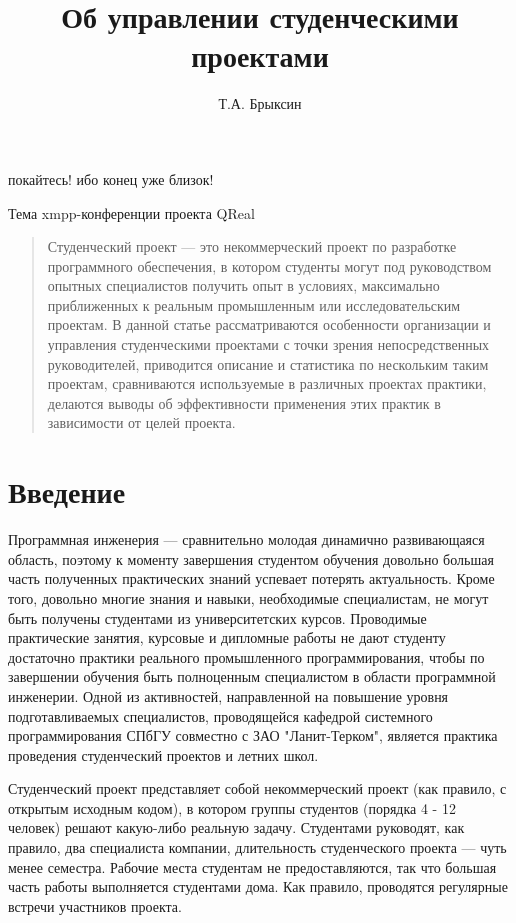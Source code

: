 \documentclass[a5paper]{article}
\title{Об управлении студенческими проектами}
\author{Т.А. Брыксин}
\date{}
\begin{document}
\maketitle
\thispagestyle{empty}

\epigraph{покайтесь! ибо конец уже близок!}%
         {Тема xmpp-конференции проекта QReal}

\begin{quote}
\small\noindent
Студенческий проект --- это некоммерческий проект по разработке программного обеспечения, в котором студенты могут под руководством опытных специалистов получить опыт в условиях, максимально приближенных к реальным промышленным или исследовательским проектам. В данной статье рассматриваются особенности организации и управления студенческими проектами с точки зрения непосредственных руководителей, приводится описание и статистика по нескольким таким проектам, сравниваются  используемые в различных проектах практики, делаются выводы об эффективности применения этих практик в зависимости от целей проекта.
\end{quote}

\section*{Введение}
Программная инженерия --- сравнительно молодая динамично развивающаяся область, поэтому к моменту завершения студентом обучения довольно большая часть полученных практических знаний успевает потерять актуальность. Кроме того, довольно многие знания и навыки, необходимые специалистам, не могут быть получены студентами из университетских курсов. Проводимые практические занятия, курсовые и дипломные работы не дают студенту достаточно практики реального  промышленного программирования, чтобы по завершении обучения быть полноценным специалистом в области программной инженерии. Одной из активностей, направленной на повышение уровня подготавливаемых специалистов, проводящейся кафедрой системного программирования СПбГУ совместно с ЗАО "Ланит-Терком", является практика проведения студенческий проектов и летних школ.

Студенческий проект представляет собой некоммерческий проект (как правило, с открытым исходным кодом), в котором группы студентов (порядка 4 - 12 человек) решают какую-либо реальную задачу. Студентами руководят, как правило, два специалиста компании, длительность студенческого проекта --- чуть менее семестра. Рабочие места студентам не предоставляются, так что большая часть работы выполняется студентами дома. Как правило, проводятся регулярные встречи участников проекта.
\end{document}
